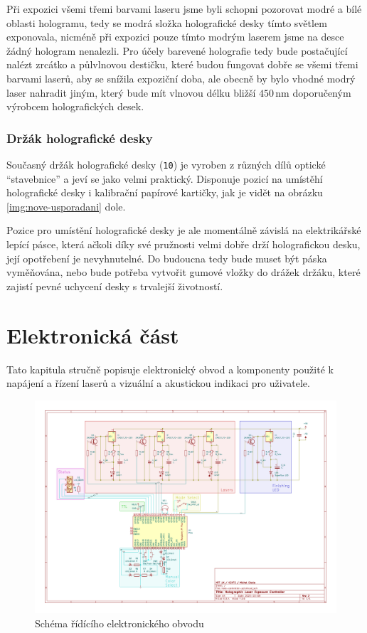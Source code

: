 \documentclass[twoside,project]{../MFFPrace}
\begin{document}
Při expozici všemi třemi barvami laseru jsme byli schopni pozorovat modré a bílé oblasti hologramu, tedy se modrá složka holografické desky tímto světlem exponovala, nicméně při expozici pouze tímto modrým laserem jsme na desce žádný hologram nenalezli. Pro účely barevené holografie tedy bude postačující nalézt zrcátko a půlvlnovou destičku, které budou fungovat dobře se všemi třemi barvami laserů, aby se snížila expoziční doba, ale obecně by bylo vhodné modrý laser nahradit jiným, který bude mít vlnovou délku bližší $450\,\text{nm}$ doporučeným výrobcem holografických desek.

\subsection*{Držák holografické desky}
Současný držák holografické desky (\texttt{10}) je vyroben z různých dílů optické "`stavebnice"' a jeví se jako velmi praktický. Disponuje pozicí na umístěhí holografické desky i kalibrační papírové kartičky, jak je vidět na obrázku \ref{img:nove-usporadani} dole.

Pozice pro umístění holografické desky je ale momentálně závislá na elektrikářské lepící pásce, která ačkoli díky své pružnosti velmi dobře drží holografickou desku, její opotřebení je nevyhnutelné. Do budoucna tedy bude muset být páska vyměňována, nebo bude potřeba vytvořit gumové vložky do drážek držáku, které zajistí pevné uchycení desky s trvalejší životností.

\chapter{Elektronická část\label{cpt:elektronika}}
\begin{center}
    Tato kapitula stručně popisuje elektronický obvod a komponenty použité k napájení a řízení laserů a vizuální a akustickou indikaci pro uživatele.
\end{center}
\begin{figure}[!ht]
    \includegraphics[width=\linewidth]{../../HoloControl-PCB/holo-controller-pcb.pdf}
    \caption{Schéma řídícího elektronického obvodu}
    \label{img:schema}
\end{figure}
\end{document}
